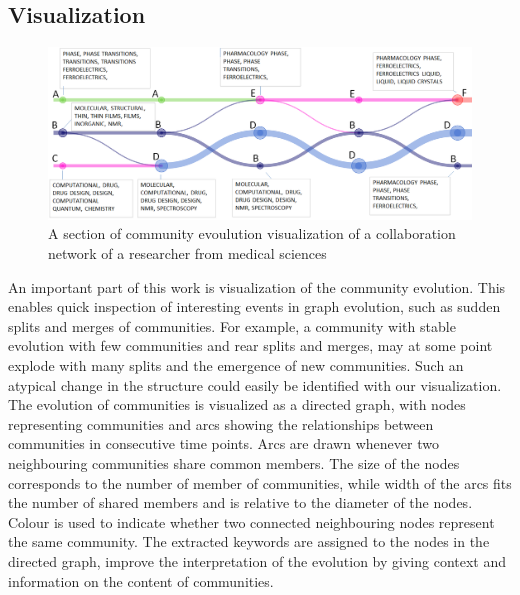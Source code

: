 \documentclass{article} %
\begin{document}
\subsection{Visualization}
\begin{figure}\label{architecture}
   	\begin{center}
   	\includegraphics[width=1\textwidth]{evo.png}
   	\end{center}
   	\caption{A section of community evoulution visualization of a collaboration network of a researcher from medical sciences}
\end{figure}
An important part of this work is visualization of the community evolution. This enables quick inspection of  interesting events in graph evolution, such as sudden splits and merges of communities. For example, a community with stable evolution with few communities and rear splits and merges, may at some point explode with many splits and the emergence of new communities. Such  an atypical change in the structure  could easily be identified with our  visualization. The evolution of communities is visualized as a directed graph, with nodes representing communities and arcs showing the relationships between communities in consecutive time points. Arcs are drawn whenever two neighbouring communities share common members. The size of the nodes corresponds to the number of member of communities, while width of the arcs fits the number of shared members and is relative to the diameter of the nodes. Colour is used to indicate whether two connected neighbouring nodes represent the same community. The extracted keywords are assigned to the nodes in the directed graph, improve the interpretation of the evolution by giving context and information on the content of communities.

 
\end{document}
